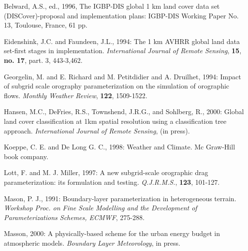 \begin{description}

\item
Belward, A.S., ed., 1996, The IGBP-DIS global 1 km land cover data set
(DISCover)-proposal and implementation plans: IGBP-DIS  Working Paper No. 13,
Toulouse, France, 61 pp.

\item
Eidenshink, J.C. and Faundeen, J.L., 1994:
The 1 km AVHRR global land data
set-first stages in implementation. {\it International Journal
of Remote Sensing}, {\bf 15}, {\bf no. 17}, part. 3, 443-3,462.

\item
Georgelin, M. and E. Richard and M. Petitdidier and A. Druilhet, 1994:
Impact of subgrid scale orography parameterization on the
simulation of orographic flows. {\it Monthly Weather Review}, {\bf 122},
1509-1522.

\item
Hansen, M.C., DeFries, R.S., Townshend, J.R.G., and Sohlberg, R., 2000:
Global land  cover classification at 1km spatial resolution using
a classification tree  approach. {\it International Journal of Remote
Sensing}, (in press).

\item
Koeppe, C. E. and De Long G. C., 1998:
Weather and Climate. Mc Graw-Hill book company.

\item
Lott, F. and M. J. Miller, 1997:
A new subgrid-scale orographic drag parameterization: its formulation
and testing. {\it Q.J.R.M.S.}, {\bf 123}, 101-127.

\item
Mason, P. J., 1991:
Boundary-layer parameterization in heterogeneous terrain.
{\it Workshop Proc. on Fine Scale Modelling and the
Development of Parameterizations Schemes, ECMWF},
275-288.

\item
Masson, 2000:
A physically-based scheme for the urban energy budget in atmospheric models.
{\it Boundary Layer Meteorology}, in press.

\end{description}

